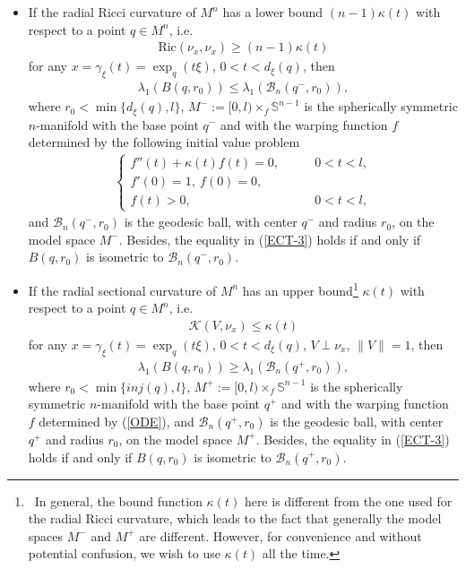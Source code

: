\documentclass[12pt]{article}
\begin{document}
\begin{itemize}
\item If the radial Ricci curvature of $M^{n}$ has a lower bound
$(n-1)\kappa(t)$ with respect to a point $q\in M^{n}$, i.e.
\begin{eqnarray*}
\mathrm{Ric}(\nu_{x},\nu_{x})\geq(n-1)\kappa(t)
\end{eqnarray*}
for any $x=\gamma_{\xi}(t)=\exp_{q}(t\xi)$, $0<t<d_{\xi}(q)$, then
 \begin{eqnarray} \label{ECT-3}
\lambda_{1}(B(q,r_0))\leq\lambda_{1}(\mathscr{B}_{n}(q^{-},r_0)),
 \end{eqnarray}
where $r_{0}<\min\{d_{\xi}(q),l\}$,
$M^{-}:=[0,l)\times_{f}\mathbb{S}^{n-1}$ is the spherically
symmetric $n$-manifold with the base point $q^{-}$ and with the
warping function $f$ determined by the following initial value
problem
\begin{eqnarray} \label{ODE}
\left\{
\begin{array}{lll}
f''(t)+\kappa(t)f(t)=0,  \qquad & 0<t<l,\\
f'(0)=1,~f(0)=0,\\
f(t)>0, \qquad & 0<t<l,
\end{array}
\right.
\end{eqnarray}
and $\mathscr{B}_{n}(q^{-},r_0)$ is the geodesic ball, with center
$q^{-}$ and radius $r_0$, on the model space $M^{-}$. Besides, the
equality in (\ref{ECT-3}) holds if and only if $B(q,r_0)$ is
isometric to $\mathscr{B}_{n}(q^{-},r_0)$.

\item If the radial sectional curvature of $M^{n}$ has an upper
bound\footnote{~In general, the bound function $\kappa(t)$ here is
different from the one used for the radial Ricci curvature, which
leads to the fact that generally the model spaces $M^{-}$ and
$M^{+}$ are different. However, for convenience and without
potential confusion, we wish to use $\kappa(t)$ all the time.}
$\kappa(t)$ with respect to a point $q\in M^{n}$, i.e.
 \begin{eqnarray*}
\mathscr{K}(V,\nu_{x})\leq\kappa(t)
 \end{eqnarray*}
for any $x=\gamma_{\xi}(t)=\exp_{q}(t\xi)$, $0<t<d_{\xi}(q)$,
$V\perp\nu_{x}$, $\|V\|=1$, then
 \begin{eqnarray} \label{ECT-4}
\lambda_{1}(B(q,r_0))\geq\lambda_{1}(\mathscr{B}_{n}(q^{+},r_0)),
 \end{eqnarray}
where $r_{0}<\min\{inj(q),l\}$,
$M^{+}:=[0,l)\times_{f}\mathbb{S}^{n-1}$ is the spherically
symmetric $n$-manifold with the base point $q^{+}$ and with the
warping function $f$ determined by (\ref{ODE}), and
$\mathscr{B}_{n}(q^{+},r_0)$ is the geodesic ball, with center
$q^{+}$ and radius $r_0$, on the model space $M^{+}$. Besides, the
equality in (\ref{ECT-3}) holds if and only if $B(q,r_0)$ is
isometric to $\mathscr{B}_{n}(q^{+},r_0)$.

\end{itemize}
\end{document}
